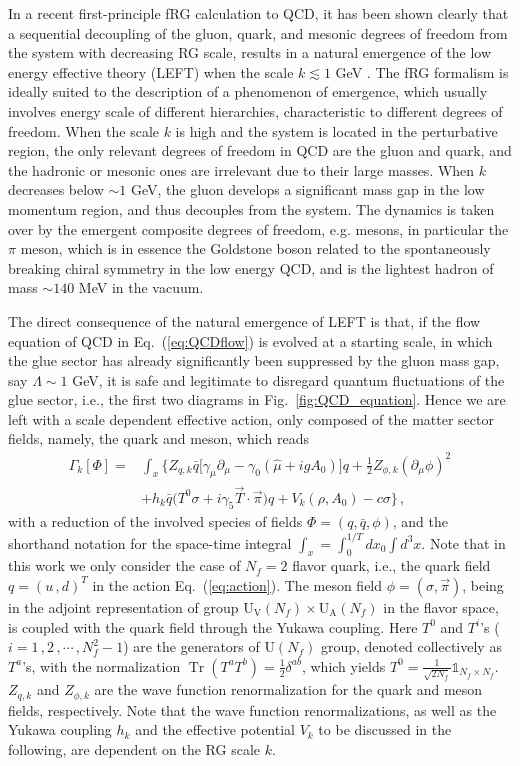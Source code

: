 \documentclass[%
reprint,
superscriptaddress,
showpacs,preprintnumbers,
 amsmath,amssymb,
 aps,
prd,
]{revtex4-1}
\newcommand{\Tr}{\ensuremath{\operatorname{Tr}}}
\def\Fig#1{Fig.~\ref{#1}} \def\Tab#1{Tab.~\ref{#1}}
\def\Eq#1{Eq.~(\ref{#1})}
\begin{document}
In a recent first-principle fRG calculation to QCD, it has been shown clearly that a sequential decoupling of the gluon, quark, and mesonic degrees of freedom from the system with decreasing RG scale, results in a natural emergence of the low energy effective theory (LEFT) when the scale $k\lesssim 1$ GeV \cite{Fu:2019hdw}. The fRG formalism is ideally suited to the description of a phenomenon of emergence, which usually involves energy scale of different hierarchies, characteristic to different degrees of freedom. When the scale $k$ is high and the system is located in the perturbative region, the only relevant degrees of freedom in QCD are the gluon and quark, and the hadronic or mesonic ones are irrelevant due to their large masses. When $k$ decreases below $\sim 1$ GeV, the gluon develops a significant mass gap in the low momentum region, and thus decouples from the system. The dynamics is taken over by the emergent composite degrees of freedom, e.g. mesons, in particular the $\pi$ meson, which is in essence the Goldstone boson related to the spontaneously breaking chiral symmetry in the low energy QCD, and is the lightest hadron of mass $\sim 140$ MeV in the vacuum. 

The direct consequence of the natural emergence of LEFT is that,  if the flow equation of QCD in \Eq{eq:QCDflow} is evolved at a starting scale, in which the glue sector has already significantly been suppressed by the gluon mass gap, say $\Lambda \sim 1$ GeV, it is safe and legitimate to disregard quantum fluctuations of the glue sector, i.e., the first two diagrams in \Fig{fig:QCD_equation}. Hence we are left with a scale dependent effective action, only composed of the matter sector fields, namely, the quark and meson, which reads
%
\begin{align}
\Gamma_k[\Phi]=&\int_x \bigg\{Z_{q,k}\bar{q} \Big [\gamma_\mu \partial_\mu -\gamma_0(\hat\mu+igA_0) \Big ]q+\frac{1}{2}Z_{\phi,k}(\partial_\mu \phi)^2 \nonumber\\[2ex]
&+h_k\bar{q}\big(T^0\sigma+i\gamma_5\vec{T}\cdot \vec{\pi}\big)q+V_k(\rho,A_0)-c\sigma \bigg\}\,,\label{eq:action}
\end{align}
%
with a reduction of the involved species of fields $\Phi=(q,\bar q,\phi)$, and the shorthand notation for the space-time integral $\int_{x}=\int_0^{1/T}d x_0 \int d^3 x$. Note that in this work we only consider the case of $N_f=2$ flavor quark, i.e., the quark field $q=(u\,,d)^{T}$ in the action \Eq{eq:action}. The meson field $\phi=\left(\sigma,\vec{\pi}\right)$, being in the adjoint representation of group $\mathrm{U_V}(N_f)\times\mathrm{U_A}(N_f)$ in the flavor space, is coupled with the quark field through the Yukawa coupling. Here $T^0$ and $T^{i}$'s ($i=1\,,2\,,\cdots\,,N_f^2-1$) are the generators of $\mathrm{U}(N_f)$ group, denoted collectively as $T^a$'s, with the normalization $\Tr(T^{a}T^{b})=\frac{1}{2}\delta^{ab}$, which yields $T^{0}=\frac{1}{\sqrt{2N_{f}}}\mathbb{1}_{N_{f}\times N_{f}}$. $Z_{q,k}$ and $Z_{\phi,k}$ are the wave function renormalization for the quark and meson fields, respectively. Note that the wave function renormalizations, as well as the Yukawa coupling $h_k$ and the effective potential $V_k$ to be discussed in the following, are dependent on the RG scale $k$. 
\end{document}
